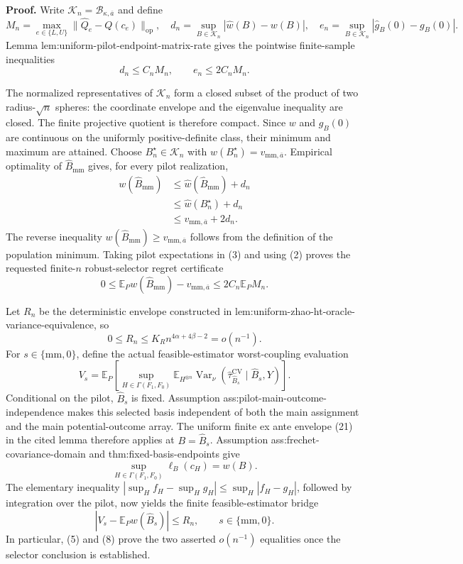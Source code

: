 \textbf{Proof.}
Write \(\mathcal K_n=\mathcal B_{\kappa,\overline a}\) and define
\[
 M_n=\max_{e\in\{L,U\}}
 \lVert\widehat Q_e-Q(c_e)\rVert_{\mathrm{op}},
 \quad
 d_n=\sup_{B\in\mathcal K_n}|\widehat w(B)-w(B)|,
 \quad
 e_n=\sup_{B\in\mathcal K_n}|\widehat g_B(0)-g_B(0)|.
 \tag{1}
\]
Lemma lem:uniform-pilot-endpoint-matrix-rate gives the pointwise finite-sample inequalities
\[
 d_n\leq C_nM_n,
 \qquad
 e_n\leq2C_nM_n.
 \tag{2}
\]

The normalized representatives of \(\mathcal K_n\) form a closed subset of the product of two radius-\(\sqrt n\) spheres: the coordinate envelope and the eigenvalue inequality are closed.  The finite projective quotient is therefore compact.  Since \(w\) and \(g_B(0)\) are continuous on the uniformly positive-definite class, their minimum and maximum are attained.  Choose \(B_n^\star\in\mathcal K_n\) with \(w(B_n^\star)=v_{\mathrm{mm},\overline a}\).  Empirical optimality of \(\widehat B_{\mathrm{mm}}\) gives, for every pilot realization,
\[
 \begin{aligned}
 w(\widehat B_{\mathrm{mm}})
 &\leq\widehat w(\widehat B_{\mathrm{mm}})+d_n\\
 &\leq\widehat w(B_n^\star)+d_n\\
 &\leq v_{\mathrm{mm},\overline a}+2d_n.
 \end{aligned}
 \tag{3}
\]
The reverse inequality \(w(\widehat B_{\mathrm{mm}})\geq v_{\mathrm{mm},\overline a}\) follows from the definition of the population minimum.  Taking pilot expectations in (3) and using (2) proves the requested finite-\(n\) robust-selector regret certificate
\[
 0\leq
 \mathbb E_Pw(\widehat B_{\mathrm{mm}})-v_{\mathrm{mm},\overline a}
 \leq2C_n\mathbb E_PM_n.
 \tag{4}
\]

Let \(R_n\) be the deterministic envelope constructed in lem:uniform-zhao-ht-oracle-variance-equivalence, so
\[
 0\leq R_n\leq K_Rn^{4\alpha+4\beta-2}=o(n^{-1}).
 \tag{5}
\]
For \(s\in\{\mathrm{mm},0\}\), define the actual feasible-estimator worst-coupling evaluation
\[
 V_s=
 \mathbb E_P\!\left[
 \sup_{H\in\Gamma(F_1,F_0)}
 \mathbb E_{H^{\otimes n}}
 \operatorname{Var}_\nu
 (\widehat\tau_{\widehat B_s}^{\mathrm{CV}}\mid\widehat B_s,Y)
 \right].
 \tag{6}
\]
Conditional on the pilot, \(\widehat B_s\) is fixed.  Assumption ass:pilot-main-outcome-independence makes this selected basis independent of both the main assignment and the main potential-outcome array.  The uniform finite ex ante envelope (21) in the cited lemma therefore applies at \(B=\widehat B_s\).  Assumption ass:frechet-covariance-domain and thm:fixed-basis-endpoints give
\[
 \sup_{H\in\Gamma(F_1,F_0)}\ell_B(c_H)=w(B).
 \tag{7}
\]
The elementary inequality \(|\sup_Hf_H-\sup_Hg_H|\leq\sup_H|f_H-g_H|\), followed by integration over the pilot, now yields the finite feasible-estimator bridge
\[
 |V_s-\mathbb E_Pw(\widehat B_s)|\leq R_n,
 \qquad s\in\{\mathrm{mm},0\}.
 \tag{8}
\]
In particular, (5) and (8) prove the two asserted \(o(n^{-1})\) equalities once the selector conclusion is established.

